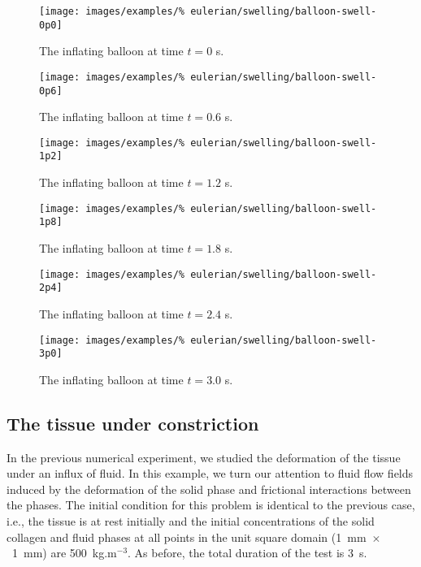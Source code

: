 \begin{figure}[!hptb]
\centering
\texttt{[image: images/examples/\%
eulerian/swelling/balloon-swell-0p0]}
\caption{The inflating balloon at time $t=0$ s.} 
\label{swelling-balloon-image-0p0}
\end{figure}

\begin{figure}[!hptb]
\centering
\texttt{[image: images/examples/\%
eulerian/swelling/balloon-swell-0p6]}
\caption{The inflating balloon at time $t=0.6$ s.} 
\label{swelling-balloon-image-0p6}
\end{figure}

\begin{figure}[!hptb]
\centering
\texttt{[image: images/examples/\%
eulerian/swelling/balloon-swell-1p2]}
\caption{The inflating balloon at time $t=1.2$ s.} 
\label{swelling-balloon-image-1p2}
\end{figure}

\begin{figure}[!hptb]
\centering
\texttt{[image: images/examples/\%
eulerian/swelling/balloon-swell-1p8]}
\caption{The inflating balloon at time $t=1.8$ s.} 
\label{swelling-balloon-image-1p8}
\end{figure}

\begin{figure}[!hptb]
\centering
\texttt{[image: images/examples/\%
eulerian/swelling/balloon-swell-2p4]}
\caption{The inflating balloon at time $t=2.4$ s.} 
\label{swelling-balloon-image-2p4}
\end{figure}

\begin{figure}[!hptb]
\centering
\texttt{[image: images/examples/\%
eulerian/swelling/balloon-swell-3p0]}
\caption{The inflating balloon at time $t=3.0$ s.} 
\label{swelling-balloon-image-3p0}
\end{figure}

\clearpage

\subsection{The tissue under constriction}
\label{constriction-2}

In the previous numerical experiment, we studied the deformation of
the tissue under an influx of fluid. In this example, we turn our
attention to fluid flow fields induced by the deformation of the solid
phase and frictional interactions between the phases. The initial
condition for this problem is identical to the previous case, i.e.,
the tissue is at rest initially and the initial concentrations of the
solid collagen and fluid phases at all points in the unit square
domain \mbox{(1~mm $\times$ 1~mm)} are 500~kg.m$^{-3}$. As before, the
total duration of the test is 3~s.

